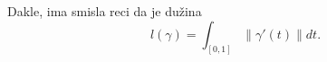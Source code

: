 \documentclass[preview]{standalone}
\begin{document}
\begin{center}
Dakle, ima smisla reci da je dužina \[l(\gamma) = 
        \int_{[0,1]} \lVert \gamma'(t)\rVert dt.\]
\end{center}
\end{document}
